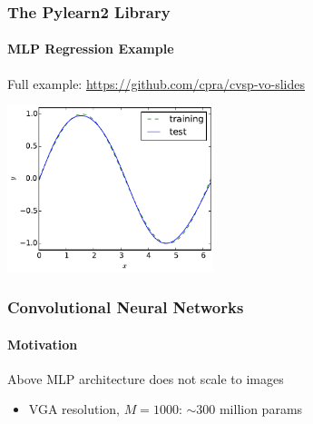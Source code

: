 \documentclass[xetex,professionalfont]{beamer}
\begin{document}
\begin{frame}
\frametitle{The Pylearn2 Library}
\framesubtitle{MLP Regression Example}

Full example: \url{https://github.com/cpra/cvsp-vo-slides}

\medskip
\begin{center}
	\includegraphics[width=6cm]{figures/mlp-regression.pdf} %
\end{center}

\end{frame}


\begin{frame}
\frametitle{Convolutional Neural Networks}
\framesubtitle{Motivation}

Above MLP architecture does not scale to images
\begin{itemize}
    \item VGA resolution, $M=1000$: $\sim300$ million params %
\end{itemize}

\medskip
\begin{center}
\end{center}

\end{frame}
\end{document}
